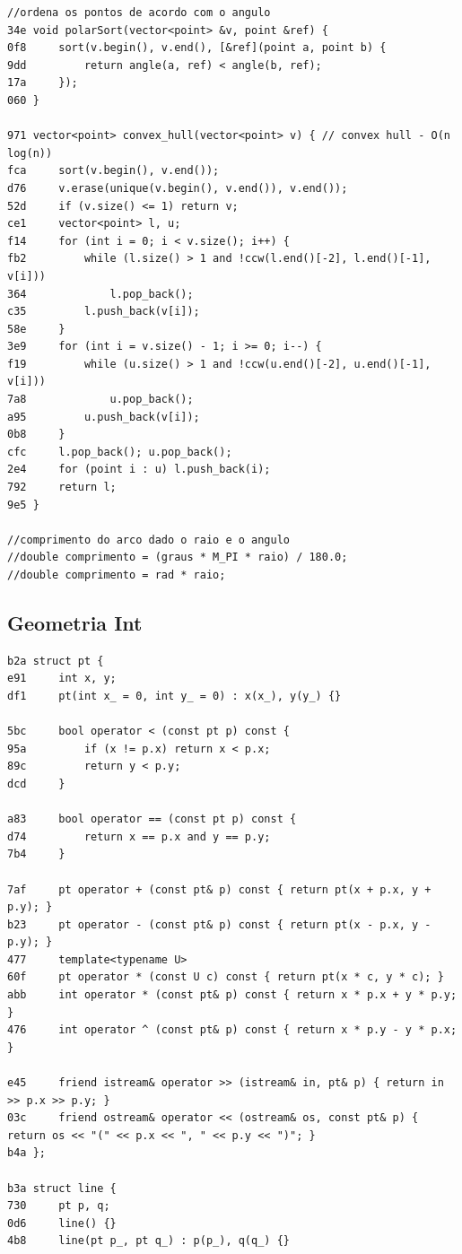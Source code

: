 \documentclass[11pt, a4paper, twoside]{article}
\begin{document}
{\begin{lstlisting}
//ordena os pontos de acordo com o angulo
34e void polarSort(vector<point> &v, point &ref) {
0f8     sort(v.begin(), v.end(), [&ref](point a, point b) {
9dd         return angle(a, ref) < angle(b, ref);
17a     });
060 }

971 vector<point> convex_hull(vector<point> v) { // convex hull - O(n log(n))
fca 	sort(v.begin(), v.end());
d76 	v.erase(unique(v.begin(), v.end()), v.end());
52d 	if (v.size() <= 1) return v;
ce1 	vector<point> l, u;
f14 	for (int i = 0; i < v.size(); i++) {
fb2 		while (l.size() > 1 and !ccw(l.end()[-2], l.end()[-1], v[i]))
364 			l.pop_back();
c35 		l.push_back(v[i]);
58e 	}
3e9 	for (int i = v.size() - 1; i >= 0; i--) {
f19 		while (u.size() > 1 and !ccw(u.end()[-2], u.end()[-1], v[i]))
7a8 			u.pop_back();
a95 		u.push_back(v[i]);
0b8 	}
cfc 	l.pop_back(); u.pop_back();
2e4 	for (point i : u) l.push_back(i);
792 	return l;
9e5 }

//comprimento do arco dado o raio e o angulo
//double comprimento = (graus * M_PI * raio) / 180.0;
//double comprimento = rad * raio;
\end{lstlisting}

\subsection{Geometria Int}
\begin{lstlisting}
b2a struct pt {
e91     int x, y;
df1     pt(int x_ = 0, int y_ = 0) : x(x_), y(y_) {}
    
5bc     bool operator < (const pt p) const {
95a 		if (x != p.x) return x < p.x;
89c 		return y < p.y;
dcd 	}
    
a83 	bool operator == (const pt p) const {
d74 		return x == p.x and y == p.y;
7b4 	}
    
7af     pt operator + (const pt& p) const { return pt(x + p.x, y + p.y); }
b23     pt operator - (const pt& p) const { return pt(x - p.x, y - p.y); }
477     template<typename U> 
60f     pt operator * (const U c) const { return pt(x * c, y * c); }
abb     int operator * (const pt& p) const { return x * p.x + y * p.y; }
476     int operator ^ (const pt& p) const { return x * p.y - y * p.x; }
    
e45     friend istream& operator >> (istream& in, pt& p) { return in >> p.x >> p.y; }
03c     friend ostream& operator << (ostream& os, const pt& p) { return os << "(" << p.x << ", " << p.y << ")"; }
b4a };

b3a struct line {
730 	pt p, q;
0d6 	line() {}
4b8 	line(pt p_, pt q_) : p(p_), q(q_) {}
    

\end{lstlisting}}
\end{document}
